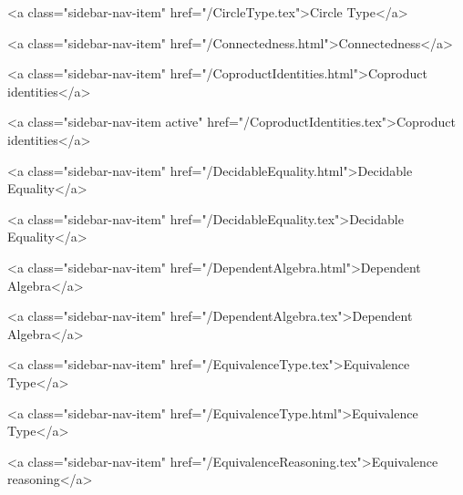       
        
          <a class="sidebar-nav-item" href="/CircleType.tex">Circle Type</a>
        
      
    
      
        
          <a class="sidebar-nav-item" href="/Connectedness.html">Connectedness</a>
        
      
    
      
        
          <a class="sidebar-nav-item" href="/CoproductIdentities.html">Coproduct identities</a>
        
      
    
      
        
          <a class="sidebar-nav-item active" href="/CoproductIdentities.tex">Coproduct identities</a>
        
      
    
      
        
          <a class="sidebar-nav-item" href="/DecidableEquality.html">Decidable Equality</a>
        
      
    
      
        
          <a class="sidebar-nav-item" href="/DecidableEquality.tex">Decidable Equality</a>
        
      
    
      
        
          <a class="sidebar-nav-item" href="/DependentAlgebra.html">Dependent Algebra</a>
        
      
    
      
        
          <a class="sidebar-nav-item" href="/DependentAlgebra.tex">Dependent Algebra</a>
        
      
    
      
        
          <a class="sidebar-nav-item" href="/EquivalenceType.tex">Equivalence Type</a>
        
      
    
      
        
          <a class="sidebar-nav-item" href="/EquivalenceType.html">Equivalence Type</a>
        
      
    
      
        
          <a class="sidebar-nav-item" href="/EquivalenceReasoning.tex">Equivalence reasoning</a>
        
